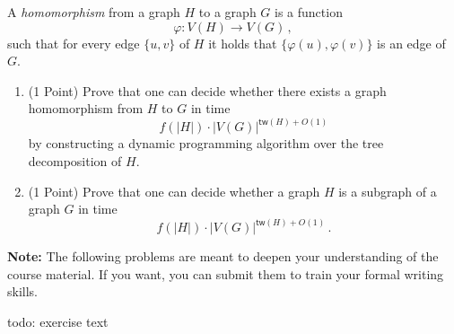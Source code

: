 \documentclass{uebung_cs}
\begin{document}
\begin{exercise}%
A \emph{homomorphism} from a graph $H$ to a graph $G$ is a function \[\varphi:V(H)\rightarrow V(G) \,, \] such that for every edge $\{u,v\}$ of $H$ it holds that $\{\varphi(u),\varphi(v)\}$ is an edge of $G$. 
\begin{enumerate}
\item (1 Point) Prove that one can decide whether there exists a graph homomorphism from $H$ to $G$ in time
\[f(|H|)\cdot |V(G)|^{\mathsf{tw}(H)+O(1)} \]
by constructing a dynamic programming algorithm over the tree decomposition of $H$.
\item (1 Point) Prove that one can decide whether a graph $H$ is a subgraph of a graph $G$ in time
\[f(|H|)\cdot |V(G)|^{\mathsf{tw}(H)+O(1)} \,.\]
\end{enumerate}
\end{exercise}

\newpage
\textbf{Note:} The following problems are meant to deepen your understanding of the course material. If you want, you can submit them to train your formal writing skills.

\begin{exercise}
  todo: exercise text
\end{exercise}
\end{document}

